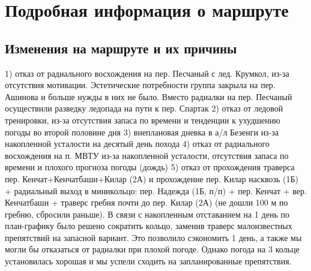 \section{Подробная информация о маршруте}\label{sec:route}
	\subsection{Изменения на маршруте и их причины}\label{subsec:changes_of_way}
1) отказ от радиального восхождения на пер. Песчаный с лед. Крумкол, из-за отсутствия мотивации. Эстетические потребности группа закрыла на пер. Ашинова и больше нужды в них не было. Вместо радиалки на пер. Песчаный осуществили разведку ледопада на пути к пер. Спартак
2) отказ от ледовой тренировки, из-за отсутствия запаса по времени и тенденции к ухудшению погоды во второй половине дня 
3) внеплановая дневка в а/л Безенги из-за накопленной усталости на десятый день похода
4) отказ от радиального восхождения на п. МВТУ из-за накопленной усталости, отсутствия запаса по времени и плохого прогноза погоды (дождь)
5) отказ от прохождения траверса пер. Кенчат+Кенчатбаши+Килар (2А) и прохождение пер. Килар насквозь (1Б) + радиальный выход в миникольцо: пер. Надежда (1Б, п/п) + пер. Кенчат + вер. Кенчатбаши + траверс гребня почти до пер. Килар (2А) (не дошли 100 м по гребню, сбросили раньше). В связи с накопленным отставанием на 1 день по план-графику было решено сократить кольцо, заменив траверс малоизвестных препятствий на запасной вариант. Это позволило сэкономить 1 день, а также мы могли бы отказаться от радиалки при плохой погоде. Однако погода на 3 кольце установилась хорошая и мы успели сходить на запланированные препятствия.

	
